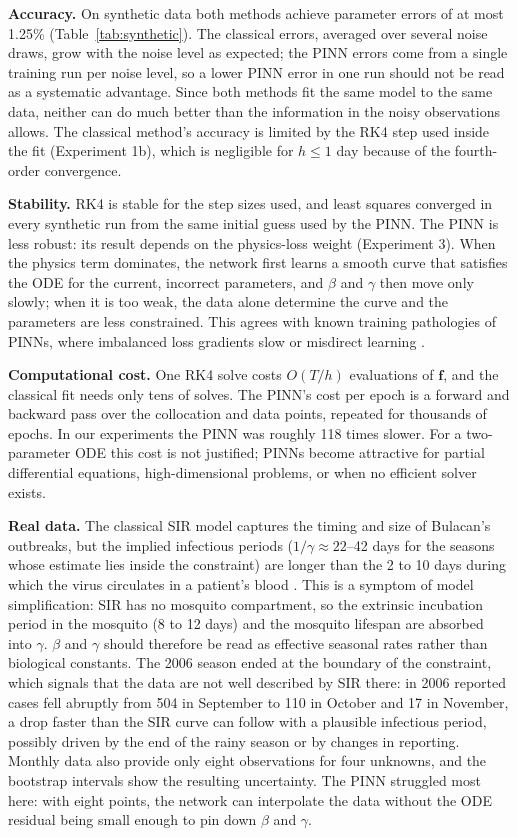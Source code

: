 \documentclass[12pt,a4paper]{article}
\begin{document}
\textbf{Accuracy.} On synthetic data both methods achieve parameter errors of at most 1.25\% (Table~\ref{tab:synthetic}). The classical errors, averaged over several noise draws, grow with the noise level as expected; the PINN errors come from a single training run per noise level, so a lower PINN error in one run should not be read as a systematic advantage. Since both methods fit the same model to the same data, neither can do much better than the information in the noisy observations allows. The classical method's accuracy is limited by the RK4 step used inside the fit (Experiment 1b), which is negligible for $h\le1$ day because of the fourth-order convergence.

\textbf{Stability.} RK4 is stable for the step sizes used, and least squares converged in every synthetic run from the same initial guess used by the PINN. The PINN is less robust: its result depends on the physics-loss weight (Experiment 3). When the physics term dominates, the network first learns a smooth curve that satisfies the ODE for the current, incorrect parameters, and $\beta$ and $\gamma$ then move only slowly; when it is too weak, the data alone determine the curve and the parameters are less constrained. This agrees with known training pathologies of PINNs, where imbalanced loss gradients slow or misdirect learning \citep{wang2021}.

\textbf{Computational cost.} One RK4 solve costs $O(T/h)$ evaluations of $\mathbf{f}$, and the classical fit needs only tens of solves. The PINN's cost per epoch is a forward and backward pass over the collocation and data points, repeated for thousands of epochs. In our experiments the PINN was roughly 118 times slower. For a two-parameter ODE this cost is not justified; PINNs become attractive for partial differential equations, high-dimensional problems, or when no efficient solver exists.

\textbf{Real data.} The classical SIR model captures the timing and size of Bulacan's outbreaks, but the implied infectious periods ($1/\gamma\approx22$--42 days for the seasons whose estimate lies inside the constraint) are longer than the 2 to 10 days during which the virus circulates in a patient's blood \citep{gubler1998}. This is a symptom of model simplification: SIR has no mosquito compartment, so the extrinsic incubation period in the mosquito (8 to 12 days) and the mosquito lifespan are absorbed into $\gamma$. $\beta$ and $\gamma$ should therefore be read as effective seasonal rates rather than biological constants. The 2006 season ended at the boundary of the constraint, which signals that the data are not well described by SIR there: in 2006 reported cases fell abruptly from 504 in September to 110 in October and 17 in November, a drop faster than the SIR curve can follow with a plausible infectious period, possibly driven by the end of the rainy season or by changes in reporting. Monthly data also provide only eight observations for four unknowns, and the bootstrap intervals show the resulting uncertainty. The PINN struggled most here: with eight points, the network can interpolate the data without the ODE residual being small enough to pin down $\beta$ and $\gamma$.
\end{document}
